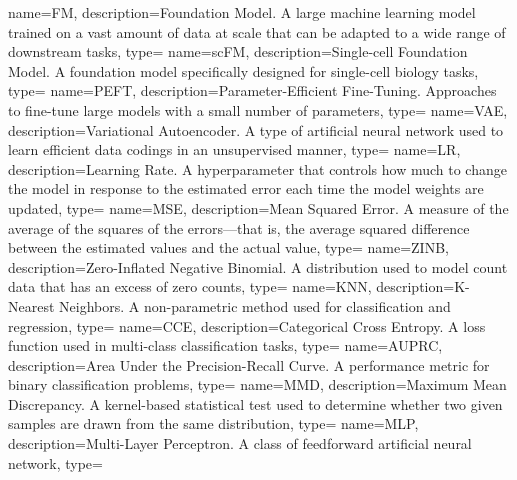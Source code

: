 {
    name={FM},
    description={Foundation Model. A large machine learning model trained on a vast amount of data at scale that can be adapted to a wide range of downstream tasks},
    type=\acronymtype
}
{
    name={scFM},
    description={Single-cell Foundation Model. A foundation model specifically designed for single-cell biology tasks},
    type=\acronymtype
}
{
    name={PEFT},
    description={Parameter-Efficient Fine-Tuning. Approaches to fine-tune large models with a small number of parameters},
    type=\acronymtype
}
{
    name={VAE},
    description={Variational Autoencoder. A type of artificial neural network used to learn efficient data codings in an unsupervised manner},
    type=\acronymtype
}
{
    name={LR},
    description={Learning Rate. A hyperparameter that controls how much to change the model in response to the estimated error each time the model weights are updated},
    type=\acronymtype
}
{
    name={MSE},
    description={Mean Squared Error. A measure of the average of the squares of the errors—that is, the average squared difference between the estimated values and the actual value},
    type=\acronymtype
}
{
    name={ZINB},
    description={Zero-Inflated Negative Binomial. A distribution used to model count data that has an excess of zero counts},
    type=\acronymtype
}
{
    name={KNN},
    description={K-Nearest Neighbors. A non-parametric method used for classification and regression},
    type=\acronymtype
}
{
    name={CCE},
    description={Categorical Cross Entropy. A loss function used in multi-class classification tasks},
    type=\acronymtype
}
{
    name={AUPRC},
    description={Area Under the Precision-Recall Curve. A performance metric for binary classification problems},
    type=\acronymtype
}
{
    name={MMD},
    description={Maximum Mean Discrepancy. A kernel-based statistical test used to determine whether two given samples are drawn from the same distribution},
    type=\acronymtype
}
{
    name={MLP},
    description={Multi-Layer Perceptron. A class of feedforward artificial neural network},
    type=\acronymtype
}
